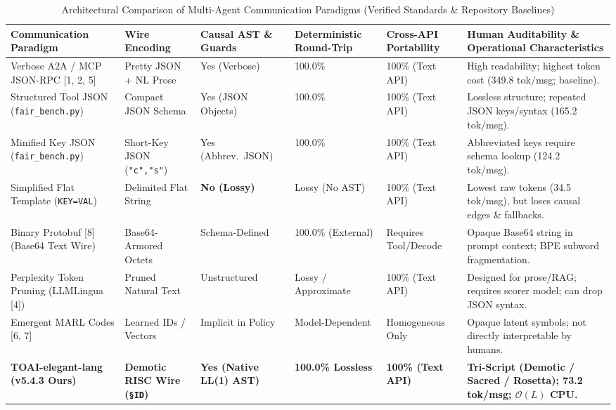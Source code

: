 \documentclass[9pt,a4paper]{extarticle}
\begin{document}
\begin{table}[h!]
\centering
\caption{Architectural Comparison of Multi-Agent Communication Paradigms (Verified Standards \& Repository Baselines)}
\label{tab:arch_comparison}
\footnotesize
\renewcommand{\arraystretch}{1.10}
\begin{tabularx}{\textwidth}{L{3.2cm} L{2.2cm} C{1.8cm} C{1.9cm} C{1.9cm} Y}
\toprule
{}
\textbf{\color{white}Communication Paradigm} &
\textbf{\color{white}Wire Encoding} &
\textbf{\color{white}Causal AST \& Guards} &
\textbf{\color{white}Deterministic Round-Trip} &
\textbf{\color{white}Cross-API Portability} &
\textbf{\color{white}Human Auditability \& Operational Characteristics} \\
\midrule
Verbose A2A / MCP JSON-RPC [1, 2, 5] & Pretty JSON + NL Prose & Yes (Verbose) & 100.0\% & 100\% (Text API) & High readability; highest token cost (349.8 tok/msg; baseline). \\
Structured Tool JSON (\texttt{fair\_bench.py}) & Compact JSON Schema & Yes (JSON Objects) & 100.0\% & 100\% (Text API) & Lossless structure; repeated JSON keys/syntax (165.2 tok/msg). \\
Minified Key JSON (\texttt{fair\_bench.py}) & Short-Key JSON (\texttt{"c","s"}) & Yes (Abbrev.\ JSON) & 100.0\% & 100\% (Text API) & Abbreviated keys require schema lookup (124.2 tok/msg). \\
Simplified Flat Template (\texttt{KEY=VAL}) & Delimited Flat String & \textbf{No (Lossy)} & Lossy (No AST) & 100\% (Text API) & Lowest raw tokens (34.5 tok/msg), but loses causal edges \& fallbacks. \\
Binary Protobuf [8] (Base64 Text Wire) & Base64-Armored Octets & Schema-Defined & 100.0\% (External) & Requires Tool/Decode & Opaque Base64 string in prompt context; BPE subword fragmentation. \\
Perplexity Token Pruning (LLMLingua [4]) & Pruned Natural Text & Unstructured & Lossy / Approximate & 100\% (Text API) & Designed for prose/RAG; requires scorer model; can drop JSON syntax. \\
Emergent MARL Codes [6, 7] & Learned IDs / Vectors & Implicit in Policy & Model-Dependent & Homogeneous Only & Opaque latent symbols; not directly interpretable by humans. \\
\textbf{TOAI-elegant-lang (v5.4.3 Ours)} & \textbf{Demotic RISC Wire (\texttt{\S ID})} & \textbf{Yes (Native LL(1) AST)} & \textbf{100.0\% Lossless} & \textbf{100\% (Text API)} & \textbf{Tri-Script (Demotic / Sacred / Rosetta); 73.2 tok/msg; $\mathcal{O}(L)$ CPU.} \\
\bottomrule
\end{tabularx}
\end{table}
\end{document}
